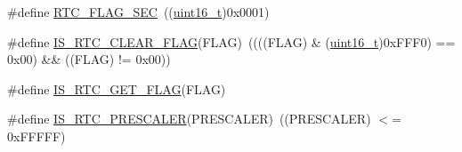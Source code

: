 \begin{DoxyCompactItemize}
\#define \hyperlink{group___r_t_c__interrupts__flags_ga8babb2c823c2097bf4a4ef0c20ef7367}{R\+T\+C\+\_\+\+F\+L\+A\+G\+\_\+\+S\+EC}~((\hyperlink{_p_e___types_8h_a1f1825b69244eb3ad2c7165ddc99c956}{uint16\+\_\+t})0x0001)
\item 
\#define \hyperlink{group___r_t_c__interrupts__flags_ga5f8a9327a258f16f29703fa3e3cc8af7}{I\+S\+\_\+\+R\+T\+C\+\_\+\+C\+L\+E\+A\+R\+\_\+\+F\+L\+AG}(F\+L\+AG)~((((F\+L\+AG) \& (\hyperlink{_p_e___types_8h_a1f1825b69244eb3ad2c7165ddc99c956}{uint16\+\_\+t})0x\+F\+F\+F0) == 0x00) \&\& ((\+F\+L\+A\+G) != 0x00))
\item 
\#define \hyperlink{group___r_t_c__interrupts__flags_ga2126725a0d48f1c40f42566e249620ef}{I\+S\+\_\+\+R\+T\+C\+\_\+\+G\+E\+T\+\_\+\+F\+L\+AG}(F\+L\+AG)
\item 
\#define \hyperlink{group___r_t_c__interrupts__flags_ga483b9ec67246cbfb2874c5a85f0cb4d8}{I\+S\+\_\+\+R\+T\+C\+\_\+\+P\+R\+E\+S\+C\+A\+L\+ER}(P\+R\+E\+S\+C\+A\+L\+ER)~((P\+R\+E\+S\+C\+A\+L\+ER) $<$= 0x\+F\+F\+F\+F\+F)
\end{DoxyCompactItemize}
